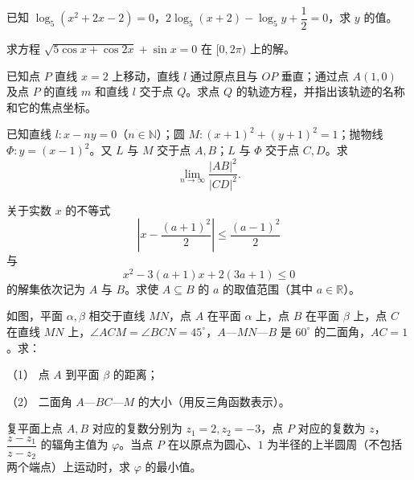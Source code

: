 \begin{question}
已知 $\log_5(x^2+2x-2)=0$，$2\log_5(x+2)-\log_5 y+\dfrac12=0$，求 $y$ 的值。

\end{question}
\begin{question}
求方程 $\sqrt{5\cos x+\cos 2x}+\sin x=0$ 在 $[0,2\pi)$ 上的解。

\end{question}
\begin{question}
已知点 $P$ 直线 $x=2$ 上移动，直线 $l$ 通过原点且与 $OP$ 垂直；通过点 $A(1,0)$ 及点 $P$ 的直线 $m$ 和直线 $l$ 交于点 $Q$。求点 $Q$ 的轨迹方程，并指出该轨迹的名称和它的焦点坐标。

\end{question}
\begin{question}
已知直线 $l:x-ny=0$（$n\in\mathbb N$）；圆 $M:(x+1)^2+(y+1)^2=1$；抛物线 $\Phi:y=(x-1)^2$。又 $L$ 与 $M$ 交于点 $A,B$；$L$ 与 $\Phi$ 交于点 $C,D$。求
\nopagebreak[4]
\[
\lim_{n\to\infty}\frac{|AB|^2}{|CD|^2}.
\]

\end{question}
\begin{question}
关于实数 $x$ 的不等式
\nopagebreak[4]
\[
\left|x-\frac{(a+1)^2}{2}\right|\leq\frac{(a-1)^2}{2}
\]
与
\nopagebreak[4]
\[
x^2-3(a+1)x+2(3a+1)\leq0
\]
的解集依次记为 $A$ 与 $B$。求使 $A\subseteq B$ 的 $a$ 的取值范围（其中 $a\in\mathbb R$）。

\Needspace{0.4\textheight}
\end{question}
\begin{question}
如图，平面 $\alpha,\beta$ 相交于直线 $MN$，点 $A$ 在平面 $\alpha$ 上，点 $B$ 在平面 $\beta$ 上，点 $C$ 在直线 $MN$ 上，$\angle ACM=\angle BCN=45^\circ$，$A$—$MN$—$B$ 是 $60^\circ$ 的二面角，$AC=1$。求：

（1） 点 $A$ 到平面 $\beta$ 的距离；

（2） 二面角 $A$—$BC$—$M$ 的大小（用反三角函数表示）。
\nopagebreak[4]
\begin{center}\end{center}
\nopagebreak[4]
\end{question}
\begin{question}
复平面上点 $A,B$ 对应的复数分别为 $z_1=2,z_2=-3$，点 $P$ 对应的复数为 $z$，$\dfrac{z-z_1}{z-z_2}$ 的辐角主值为 $\varphi$。当点 $P$ 在以原点为圆心、$1$ 为半径的上半圆周（不包括两个端点）上运动时，求 $\varphi$ 的最小值。

\end{question}